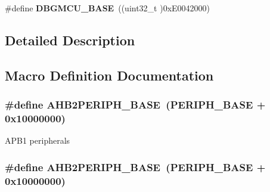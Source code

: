 \begin{DoxyCompactItemize}
\item 
\hypertarget{group___peripheral__memory__map_ga4adaf4fd82ccc3a538f1f27a70cdbbef}{\#define {\bfseries D\-B\-G\-M\-C\-U\-\_\-\-B\-A\-S\-E}~((uint32\-\_\-t )0x\-E0042000)}\label{group___peripheral__memory__map_ga4adaf4fd82ccc3a538f1f27a70cdbbef}

\end{DoxyCompactItemize}


\subsection{Detailed Description}


\subsection{Macro Definition Documentation}
\hypertarget{group___peripheral__memory__map_gaeedaa71d22a1948492365e2cd26cfd46}{
\subsubsection[{A\-H\-B2\-P\-E\-R\-I\-P\-H\-\_\-\-B\-A\-S\-E}]{\setlength{\rightskip}{0pt plus 5cm}\#define A\-H\-B2\-P\-E\-R\-I\-P\-H\-\_\-\-B\-A\-S\-E~({\bf P\-E\-R\-I\-P\-H\-\_\-\-B\-A\-S\-E} + 0x10000000)}}\label{group___peripheral__memory__map_gaeedaa71d22a1948492365e2cd26cfd46}
A\-P\-B1 peripherals \hypertarget{group___peripheral__memory__map_gaeedaa71d22a1948492365e2cd26cfd46}{
\subsubsection[{A\-H\-B2\-P\-E\-R\-I\-P\-H\-\_\-\-B\-A\-S\-E}]{\setlength{\rightskip}{0pt plus 5cm}\#define A\-H\-B2\-P\-E\-R\-I\-P\-H\-\_\-\-B\-A\-S\-E~({\bf P\-E\-R\-I\-P\-H\-\_\-\-B\-A\-S\-E} + 0x10000000)}}\label{group___peripheral__memory__map_gaeedaa71d22a1948492365e2cd26cfd46}
